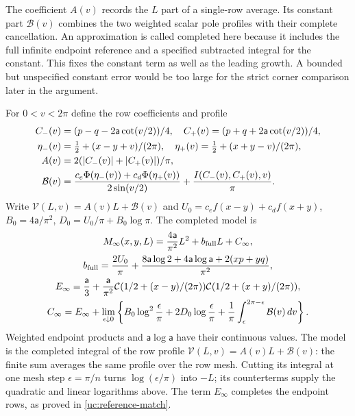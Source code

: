 The coefficient $A(v)$ records the $L$ part of a single-row average.
Its constant part $\mathcal B(v)$ combines the two weighted scalar
pole profiles with their complete cancellation. An approximation is
called completed here because it includes the full infinite endpoint
reference and a specified subtracted integral for the constant. This
fixes the constant term as well as the leading growth. A bounded but
unspecified constant error would be too large for the strict corner
comparison later in the argument.

For $0<v<2\pi$ define the row coefficients and profile
\begin{align}\label{uc:row-profile}
 C_-(v)&=(p-q-2\mathsf{a}\cot(v/2))/4,\quad C_+(v)=(p+q+2\mathsf{a}\cot(v/2))/4,\notag\\
 \eta_-(v)&=\tfrac12+(x-y+v)/(2\pi),\quad
 \eta_+(v)=\tfrac12+(x+y-v)/(2\pi),\notag\\
 A(v)&=2(|C_-(v)|+|C_+(v)|)/\pi,\notag\\
 \mathcal B(v)&=\frac{c_e\Phi(\eta_-(v))+c_d\Phi(\eta_+(v))}
                         {2\sin(v/2)}+\frac{I(C_-(v),C_+(v),v)}\pi.
\end{align}
Write $\mathcal{V}(L,v)=A(v)L+\mathcal B(v)$ and
$U_0=c_ef(x-y)+c_df(x+y)$, $B_0=4\mathsf{a}/\pi^2$,
$D_0=U_0/\pi+B_0\log\pi$. The completed model is
\begin{equation}\label{uc:completed-model}
 \begin{gathered}
 M_\infty(x,y,L)=\frac{4\mathsf{a}}{\pi^2}L^2+b_{\rm full}L+C_\infty,\\
 b_{\rm full}=\frac{2U_0}\pi+
 \frac{8\mathsf{a}\log2+4\mathsf{a}\log \mathsf{a}+2(xp+yq)}{\pi^2},\\
 E_\infty=\frac {\mathsf{a}}{3}+
 \frac{\mathsf{a}}{\pi^2}\mathcal C(1/2+(x-y)/(2\pi))
                         \mathcal C(1/2+(x+y)/(2\pi)),\\
 C_\infty=E_\infty+\lim_{\epsilon\downarrow0}
 \left\{B_0\log^2\frac\epsilon\pi+2D_0\log\frac\epsilon\pi
            +\frac1\pi\int_\epsilon^{2\pi-\epsilon}\mathcal B(v)\,dv\right\}.
 \end{gathered}
\end{equation}
Weighted endpoint products and $\mathsf{a}\log \mathsf{a}$ have their continuous values.
The model is the completed integral of the row profile
$\mathcal V(L,v)=A(v)L+\mathcal B(v)$: the finite sum averages the
same profile over the row mesh. Cutting its integral at one mesh step
$\epsilon=\pi/n$ turns $\log(\epsilon/\pi)$ into $-L$; its
counterterms supply the quadratic and linear logarithms above.
The term $E_\infty$ completes the endpoint rows, as proved in
\eqref{uc:reference-match}.

